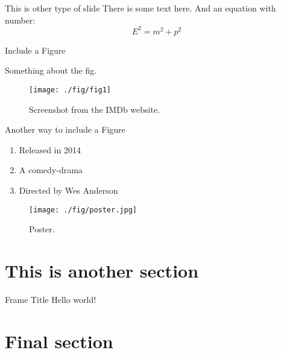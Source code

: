 \documentclass[10pt, xcolor = svgnames]{beamer} %
\begin{document}
\begin{frame}[standout]{This is other type of slide}
There is some text here.
And an equation with number:
\begin{equation}
    E^{2} = m^{2} + p^{2}
\end{equation}
\end{frame}


\begin{frame}{Include a Figure}
\begin{small}
Something about the fig.
\end{small}
\begin{figure}
\centering
\texttt{[image: ./fig/fig1]}
\caption{Screenshot from the IMDb website.}
\label{fig1}
\end{figure}
\end{frame}


\begin{frame}[fragile]{Another way to include a Figure}
\begin{minipage}{0.45\textwidth}
\begin{enumerate}
	\item Released in 2014
	\item A comedy-drama
	\item Directed by Wes Anderson
\end{enumerate}
\end{minipage}
\hspace{20pt}
\begin{minipage}{0.45\textwidth}
\begin{figure}
\centering
\texttt{[image: ./fig/poster.jpg]}
\caption{Poster.}
\label{fig1}
\end{figure}
\end{minipage}
\end{frame}







\section{This is another section}
\begin{frame}{Frame Title} %
    Hello world!
\end{frame}



\section{Final section}
\end{document}
